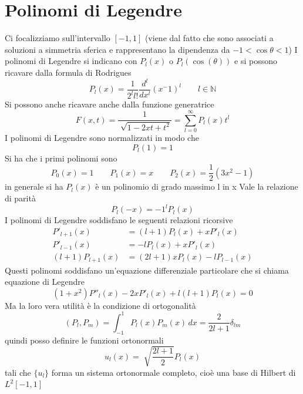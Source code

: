 \documentclass[a4paper,11pt]{report}
\theoremstyle{remark}
\theoremstyle{definition}
\begin{document}
\section{Polinomi di Legendre}
Ci focalizziamo sull'intervallo $[-1,1]$ (viene dal fatto che sono associati a soluzioni a simmetria sferica e rappresentano la dipendenza da $-1<\cos{\theta}<1$) \newline
I polinomi di Legendre si indicano con $P_l(x)$ o $P_l(\cos{(\theta)})$ e si possono ricavare dalla formula di Rodrigues
\begin{equation*}
	P_l(x) = \frac{1}{2^ll!}\frac{d^l}{dx^l}{(x^-1)}^l \qquad l\in \mathbb{N}
\end{equation*}
Si possono anche ricavare anche dalla funzione generatrice
\begin{equation*}
	F(x,t) = \frac{1}{\sqrt[]{1-2xt+t^2}} = \sum_{l=0}^\infty P_l(x)t^l
\end{equation*}
I polinomi di Legendre sono normalizzati in modo che 
\begin{equation*}
	P_l(1)=1
\end{equation*}
Si ha che i primi polinomi sono
\begin{equation*}
	P_0(x)=1 \qquad P_1(x)=x \qquad P_2(x)= \frac{1}{2}(3x^2-1)
\end{equation*}
in generale si ha $P_l(x)$ è un polinomio di grado massimo l in x \newline
Vale la relazione di parità
\begin{equation*}
	P_l(-x) = -1^lP_l(x)
\end{equation*}
I polinomi di Legendre soddisfano le seguenti relazioni ricorsive
\begin{align*}
	P'_{l+1}(x) &= (l+1)P_l(x)+xP'_l(x)\\
	P'_{l-1}(x) &= -lP_l(x)+xP'_l(x)\\
	(l+1)P_{l+1}(x) &= (2l+1)xP_l(x)-lP_{l-1}(x)
\end{align*}
Questi polinomi soddisfano un'equazione differenziale particolare che si chiama equazione di Legendre
\begin{equation*}
	(1+x^2)P''_l(x) - 2xP'_l(x)+l(l+1)P_l(x) =0
\end{equation*}
Ma la loro vera utilità è la condizione di ortogonalità
\begin{equation*}
	(P_l,P_m) = \int_{-1}^1 P_l(x)P_m(x) \, dx = \frac{2}{2l+1}\delta_{lm}
\end{equation*}
quindi posso definire le funzioni ortonormali
\begin{equation*}
	u_l(x)=\sqrt[]{\frac{2l+1}{2}}P_l(x)
\end{equation*}
tali che $\{u_l\}$ forma un sistema ortonormale completo, cioè una base di Hilbert di $L^2[-1,1]$
\end{document}

